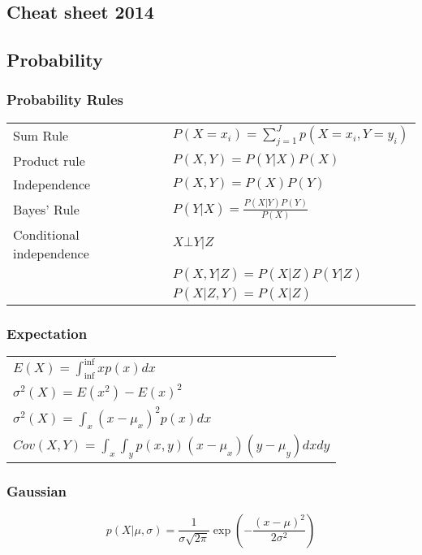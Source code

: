 \documentclass[main]{subfiles}
\begin{document}
\begin{landscape}
\ifx\cheatsheet\undefined
{}
\else
\color{sectionColor}\section{Cheat sheet 2014} %
\fi
%
%
\begin{multicols}{4}
\scriptsize
{\color{subsectionColor}\subsection{Probability}}
{\color{subsubsectionColor}\subsubsection{Probability Rules}}
\begin{tabular}{p{5em}l}
Sum Rule& \(P(X=x_i) = \sum_{j=1}^{J} p(X=x_i,Y=y_i)\)\\
Product rule& \(P(X, Y) = P(Y|X) P(X)\) \\
Independence& \(P(X, Y) = P(X)P(Y)\) \\
Bayes' Rule& \(P(Y|X) = \frac{P(X|Y)P(Y)}{P(X)}\) \\
Conditional independence& \(X\bot Y|Z \)\\
 & \(P(X,Y|Z) = P(X|Z)P(Y|Z)\) \\
 & \(P(X|Z,Y) = P(X|Z)\)
\end{tabular}
{\color{subsubsectionColor}\subsubsection{Expectation}}
\begin{tabular}{l}
\(E(X) = \int_{\inf}^{\inf} x p(x) dx\) \\
\(\sigma^2(X) = E(x^2)-{E(x)}^2\) \\
\(\sigma^2(X) = \int_x (x-\mu_x)^2 p(x) dx\) \\
\(Cov(X, Y) = \int_x \int_y p(x,y) (x-\mu_x)(y-\mu_y) dx dy\)
\end{tabular}

{\color{subsubsectionColor}\subsubsection{Gaussian}}
\begin{equation}
p(X|\mu,\sigma)=\frac{1}{\sigma \sqrt{2\pi}} \exp(-\frac{(x-\mu)^2}{2\sigma^2})
\end{equation}


\end{multicols}
\end{landscape}
\end{document}
